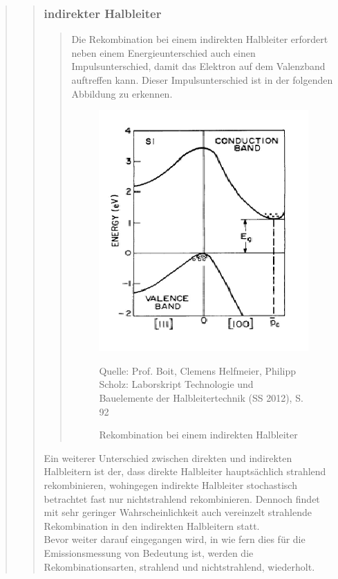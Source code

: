 \begin{quote}
\begin{quote}
            \subsubsection{indirekter Halbleiter}
            \begin{quote}
            Die Rekombination bei einem indirekten Halbleiter erfordert neben
            einem Energieunterschied auch einen Impulsunterschied, damit das
            Elektron auf dem Valenzband auftreffen kann. Dieser
            Impulsunterschied ist in der folgenden Abbildung zu erkennen.

            \begin{figure}[H]
                    \centering
                        \includegraphics[scale=0.73, trim = 1cm 0cm 1.5cm 0cm,
                        clip]{./Emissionsbilder/restliches/indirekt.png}
                        \caption{Rekombination bei einem indirekten Halbleiter}
                                \begin{center}
                                    \small Quelle: Prof. Boit, Clemens Helfmeier, Philipp Scholz: Laborskript Technologie und Bauelemente der Halbleitertechnik (SS 2012), S. 92
                                \end{center}
                            \label{fig:./Emissionsbilder/restliches/indirekt.png}
            \end{figure}

            \end{quote}

            Ein weiterer Unterschied zwischen direkten und indirekten
            Halbleitern ist der, dass direkte Halbleiter hauptsächlich
            strahlend rekombinieren, wohingegen indirekte Halbleiter
            stochastisch betrachtet fast nur nichtstrahlend rekombinieren.
            Dennoch findet mit sehr geringer Wahrscheinlichkeit auch vereinzelt
            strahlende Rekombination in den indirekten Halbleitern statt.\\
            Bevor weiter darauf eingegangen wird, in wie fern dies für die
            Emissionsmessung von Bedeutung ist, werden die Rekombinationsarten,
            strahlend und nichtstrahlend, wiederholt.


\end{quote}
\end{quote}
